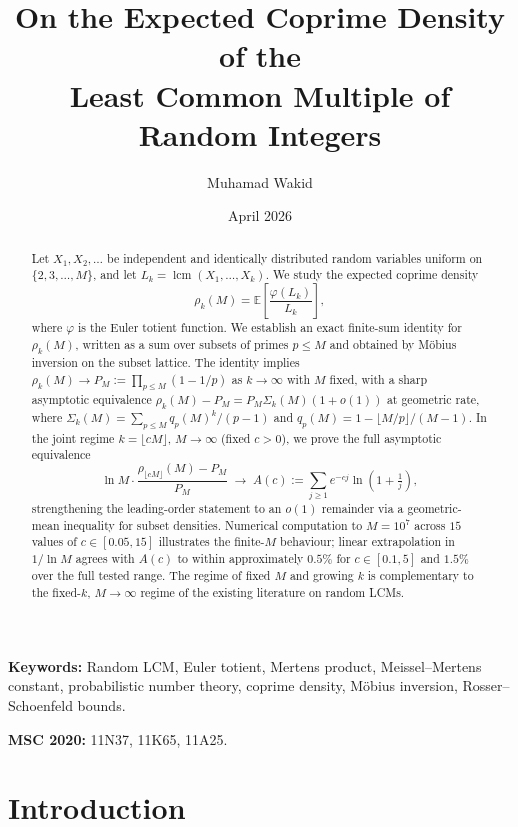 \documentclass[11pt]{article}
\title{On the Expected Coprime Density of the\\[2pt]
Least Common Multiple of Random Integers}
\author{Muhamad Wakid}
\date{April 2026}
\theoremstyle{remark}
\newcommand{\lcm}{\operatorname{lcm}}
\newcommand{\EE}{\mathbb{E}}
\begin{document}
\maketitle
\thispagestyle{fancy}

\begin{abstract}
Let $X_1, X_2, \ldots$ be independent and identically distributed random variables uniform on $\{2, 3, \ldots, M\}$, and let $L_k = \lcm(X_1, \ldots, X_k)$. We study the expected coprime density
\[
\rho_k(M) = \EE\!\left[\frac{\varphi(L_k)}{L_k}\right],
\]
where $\varphi$ is the Euler totient function. We establish an exact finite-sum identity for $\rho_k(M)$, written as a sum over subsets of primes $p \leq M$ and obtained by M\"obius inversion on the subset lattice. The identity implies $\rho_k(M) \to P_M := \prod_{p \leq M}(1 - 1/p)$ as $k \to \infty$ with $M$ fixed, with a sharp asymptotic equivalence $\rho_k(M) - P_M = P_M \Sigma_k(M)(1 + o(1))$ at geometric rate, where $\Sigma_k(M) = \sum_{p \leq M} q_p(M)^k/(p-1)$ and $q_p(M) = 1 - \lfloor M/p\rfloor/(M-1)$. In the joint regime $k = \lfloor cM \rfloor$, $M \to \infty$ (fixed $c > 0$), we prove the full asymptotic equivalence
\[
\ln M \cdot \frac{\rho_{\lfloor cM \rfloor}(M) - P_M}{P_M} \;\longrightarrow\; A(c) := \sum_{j \geq 1} e^{-cj} \ln\!\left(1 + \tfrac{1}{j}\right),
\]
strengthening the leading-order statement to an $o(1)$ remainder via a geometric-mean inequality for subset densities. Numerical computation to $M = 10^7$ across $15$ values of $c \in [0.05, 15]$ illustrates the finite-$M$ behaviour; linear extrapolation in $1/\ln M$ agrees with $A(c)$ to within approximately $0.5\%$ for $c \in [0.1, 5]$ and $1.5\%$ over the full tested range. The regime of fixed $M$ and growing $k$ is complementary to the fixed-$k$, $M \to \infty$ regime of the existing literature on random LCMs.
\end{abstract}

\noindent\textbf{Keywords:} Random LCM, Euler totient, Mertens product, Meissel--Mertens constant, probabilistic number theory, coprime density, M\"obius inversion, Rosser--Schoenfeld bounds.

\noindent\textbf{MSC 2020:} 11N37, 11K65, 11A25.

\section{Introduction}
\end{document}
